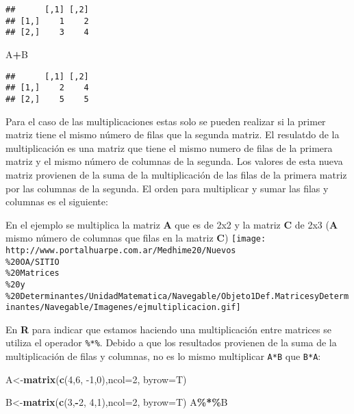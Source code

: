 \documentclass[
]{article}
\newenvironment{Shaded}{\begin{snugshade}}{\end{snugshade}}
\newcommand{\DataTypeTok}[1]{\textcolor[rgb]{0.13,0.29,0.53}{#1}}
\newcommand{\DecValTok}[1]{\textcolor[rgb]{0.00,0.00,0.81}{#1}}
\newcommand{\KeywordTok}[1]{\textcolor[rgb]{0.13,0.29,0.53}{\textbf{#1}}}
\newcommand{\NormalTok}[1]{#1}
\newcommand{\OperatorTok}[1]{\textcolor[rgb]{0.81,0.36,0.00}{\textbf{#1}}}
\begin{document}
\begin{verbatim}
##      [,1] [,2]
## [1,]    1    2
## [2,]    3    4
\end{verbatim}

\begin{Shaded}
\begin{Highlighting}[]
\NormalTok{A}\OperatorTok{+}\NormalTok{B}
\end{Highlighting}
\end{Shaded}

\begin{verbatim}
##      [,1] [,2]
## [1,]    2    4
## [2,]    5    5
\end{verbatim}

Para el caso de las multiplicaciones estas solo se pueden realizar si la
primer matriz tiene el mismo número de filas que la segunda matriz. El
resulatdo de la multiplicación es una matriz que tiene el mismo numero
de filas de la primera matriz y el mismo número de columnas de la
segunda. Los valores de esta nueva matriz provienen de la suma de la
multiplicación de las filas de la primera matriz por las columnas de la
segunda. El orden para multiplicar y sumar las filas y columnas es el
siguiente:

En el ejemplo se multiplica la matriz \textbf{A} que es de 2x2 y la
matriz \textbf{C} de 2x3 (\textbf{A} mismo número de columnas que filas
en la matriz \textbf{C})
\texttt{[image: http://www.portalhuarpe.com.ar/Medhime20/Nuevos\\\%20OA/SITIO\\\%20Matrices\\\%20y\\\%20Determinantes/UnidadMatematica/Navegable/Objeto1Def.MatricesyDeterminantes/Navegable/Imagenes/ejmultiplicacion.gif]}

En \textbf{R} para indicar que estamos haciendo una multiplicación entre
matrices se utiliza el operador \texttt{\%*\%}. Debido a que los
resultados provienen de la suma de la multiplicación de filas y
columnas, no es lo mismo multiplicar \texttt{A*B} que \texttt{B*A}:

\begin{Shaded}
\begin{Highlighting}[]
\NormalTok{A\textless{}{-}}\KeywordTok{matrix}\NormalTok{(}\KeywordTok{c}\NormalTok{(}\DecValTok{4}\NormalTok{,}\DecValTok{6}\NormalTok{,}
           \DecValTok{{-}1}\NormalTok{,}\DecValTok{0}\NormalTok{),}\DataTypeTok{ncol=}\DecValTok{2}\NormalTok{, }\DataTypeTok{byrow=}\NormalTok{T)}

\NormalTok{B\textless{}{-}}\KeywordTok{matrix}\NormalTok{(}\KeywordTok{c}\NormalTok{(}\DecValTok{3}\NormalTok{,}\OperatorTok{{-}}\DecValTok{2}\NormalTok{,}
            \DecValTok{4}\NormalTok{,}\DecValTok{1}\NormalTok{),}\DataTypeTok{ncol=}\DecValTok{2}\NormalTok{, }\DataTypeTok{byrow=}\NormalTok{T)}
\NormalTok{A}\OperatorTok{\%*\%}\NormalTok{B}
\end{Highlighting}
\end{Shaded}
\end{document}
